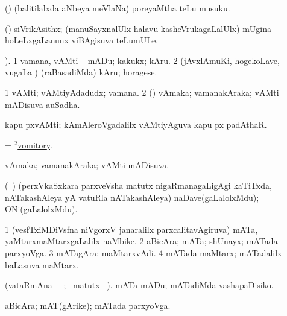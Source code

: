 \bentry 
{} 
\gl{\nA}
\expl{}
\bmng
 (\savi) (balitilalxda aNbeya meVlaNa) poreyaMtha teLu musuku. 
\emng
\eentry

\bentry 
{} 
\gl{\nA}
\expl{}
\bmng
 (\aMrashA) siVrikAsithx; (manuSayxnalUlx halavu kasheVrukagaLalUlx) mUgina hoLeLxgaLanunx viBAgisuva teLumULe. 
\emng
\eentry

\bentry
{} 
\gl{\sakirx}
). \bmng
\bnum
\num{1} vamana, vAMti -- mADu; kakukx; kAru. 
\num{2} (jAvxlAmuKi, hogekoLave, \mo vugaLa \vi) (raBasadiMda) kAru; horagese. 
\enum
\emng
\eentry

\bentry 
{} 
\gl{\nA}
\expl{}
\bmng
\bnum
\num{1} vAMti; vAMtiyAdadudx; vamana. 
\num{2} (\pArxparx) vAmaka; vamanakAraka; vAMti mADisuva auSadha. 
\enum
\emng

\noindent 
\gl{\pagu}
\expl{}
\bmng
  kapu pxvAMti; kAmAleroVgadalilx vAMtiyAguva kapu px padAthaR. 
\emng
\eentry

\bentry
{} 
\gl{\nA}
\bmng
 = \hyperlink{vomitory(2)}{$^2$vomitory}. 
\emng
\eentry

\bentry
{} 
\gl{\gu}
\expl{}
\bmng
vAmaka; vamanakAraka; vAMti mADisuva. 
\emng
\eentry

\bentry 
{} 
\gl{\nA}
\bmng
 (\roV\ \pArxkatx) (perxVkaSxkara parxveVsha matutx nigaRmanagaLigAgi kaTiTxda, nATakashAleya yA vatuRla nATakashAleya) naDave(gaLalolxMdu); ONi(gaLalolxMdu). 
\emng
\eentry

\bentry 
{} 
\gl{\nA}
\expl{}
\bmng
\bnum
\num{1} (vesfTxiMDiVsfna niVgorxV janaralilx parxcalitavAgiruva) mATa, yaMtarxmaMtarxgaLalilx naMbike. 
\num{2} aBicAra; mATa; shUnayx; mATada parxyoVga. 
\num{3} mATagAra; maMtarxvAdi. 
\num{4} mATada maMtarx; mATadalilx baLasuva maMtarx. 
\enum
\emng
\eentry

\bentry
{} 
\gl{\sakirx}(vataRmAna \parxpu\ \Eva\ ; \BU\ matutx
\BUkaq\ ). \bmng
 mATa mADu; mATadiMda vashapaDisiko. 
\emng
\eentry

\bentry 
{} 
\gl{\nA}
\expl{}
\bmng
 aBicAra; mAT(gArike); mATada parxyoVga. 
\emng
\eentry

